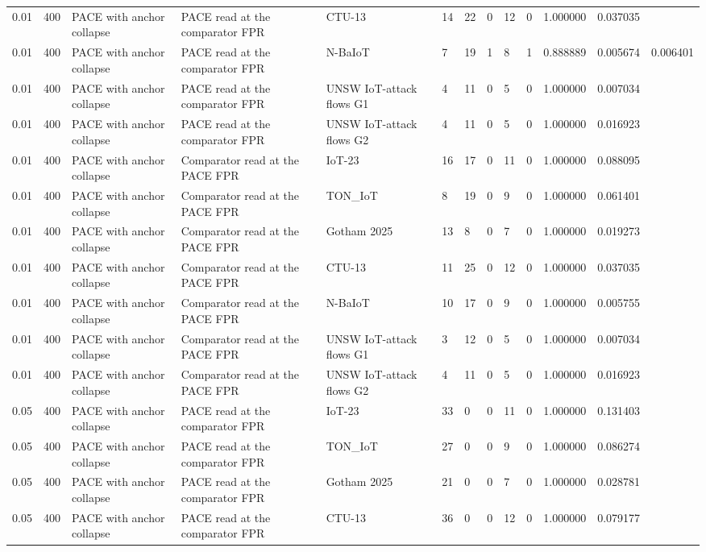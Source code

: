 \begin{tabular}{lllllllllllll}
0.01 & 400 & PACE with anchor collapse & PACE read at the comparator FPR & CTU-13 & 14 & 22 & 0 & 12 & 0 & 1.000000 & 0.037035 &  \\
0.01 & 400 & PACE with anchor collapse & PACE read at the comparator FPR & N-BaIoT & 7 & 19 & 1 & 8 & 1 & 0.888889 & 0.005674 & 0.006401 \\
0.01 & 400 & PACE with anchor collapse & PACE read at the comparator FPR & UNSW IoT-attack flows G1 & 4 & 11 & 0 & 5 & 0 & 1.000000 & 0.007034 &  \\
0.01 & 400 & PACE with anchor collapse & PACE read at the comparator FPR & UNSW IoT-attack flows G2 & 4 & 11 & 0 & 5 & 0 & 1.000000 & 0.016923 &  \\
0.01 & 400 & PACE with anchor collapse & Comparator read at the PACE FPR & IoT-23 & 16 & 17 & 0 & 11 & 0 & 1.000000 & 0.088095 &  \\
0.01 & 400 & PACE with anchor collapse & Comparator read at the PACE FPR & TON\_IoT & 8 & 19 & 0 & 9 & 0 & 1.000000 & 0.061401 &  \\
0.01 & 400 & PACE with anchor collapse & Comparator read at the PACE FPR & Gotham 2025 & 13 & 8 & 0 & 7 & 0 & 1.000000 & 0.019273 &  \\
0.01 & 400 & PACE with anchor collapse & Comparator read at the PACE FPR & CTU-13 & 11 & 25 & 0 & 12 & 0 & 1.000000 & 0.037035 &  \\
0.01 & 400 & PACE with anchor collapse & Comparator read at the PACE FPR & N-BaIoT & 10 & 17 & 0 & 9 & 0 & 1.000000 & 0.005755 &  \\
0.01 & 400 & PACE with anchor collapse & Comparator read at the PACE FPR & UNSW IoT-attack flows G1 & 3 & 12 & 0 & 5 & 0 & 1.000000 & 0.007034 &  \\
0.01 & 400 & PACE with anchor collapse & Comparator read at the PACE FPR & UNSW IoT-attack flows G2 & 4 & 11 & 0 & 5 & 0 & 1.000000 & 0.016923 &  \\
0.05 & 400 & PACE with anchor collapse & PACE read at the comparator FPR & IoT-23 & 33 & 0 & 0 & 11 & 0 & 1.000000 & 0.131403 &  \\
0.05 & 400 & PACE with anchor collapse & PACE read at the comparator FPR & TON\_IoT & 27 & 0 & 0 & 9 & 0 & 1.000000 & 0.086274 &  \\
0.05 & 400 & PACE with anchor collapse & PACE read at the comparator FPR & Gotham 2025 & 21 & 0 & 0 & 7 & 0 & 1.000000 & 0.028781 &  \\
0.05 & 400 & PACE with anchor collapse & PACE read at the comparator FPR & CTU-13 & 36 & 0 & 0 & 12 & 0 & 1.000000 & 0.079177 &  \\

\end{tabular}
